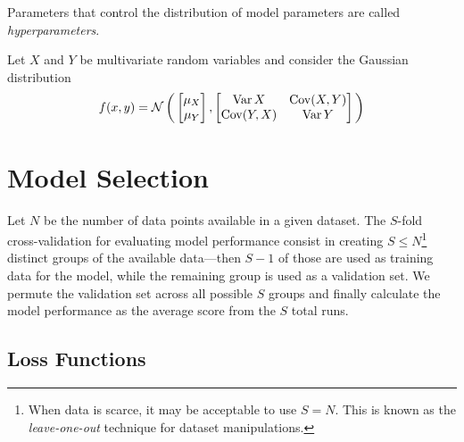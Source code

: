 \begin{definition}[Hyperparameters]
\label{def:hyperparameters}
Parameters that control the distribution of model parameters are called
\emph{hyperparameters}.
\end{definition}

Let \(X\) and \(Y\) be multivariate random variables and consider the
Gaussian distribution
\[
f(x, y) = \operatorname{\mathcal{N}}\bigg(
\begin{bmatrix}
  \mu_X \\
  \mu_Y
\end{bmatrix},
\begin{bmatrix}
  \operatorname{Var} X     & \operatorname{Cov}(X, Y) \\
  \operatorname{Cov}(Y, X) & \operatorname{Var} Y
\end{bmatrix}
\bigg)
\]

\section{Model Selection}

\begin{definition}
\label{def:s-fold-cross-validation}
Let \(N\) be the number of data points available in a given dataset. The
\(S\)-fold cross-validation for evaluating model performance consist in creating
\(S \leq N\)\footnote{When data is scarce, it may be acceptable to use
  \(S = N\). This is known as the \emph{leave-one-out} technique for dataset
  manipulations.} distinct groups of the available data---then \(S-1\) of those
are used as training data for the model, while the remaining group is used as a
validation set. We permute the validation set across all possible \(S\) groups
and finally calculate the model performance as the average score from the \(S\)
total runs.
\end{definition}

\subsection{Loss Functions}

